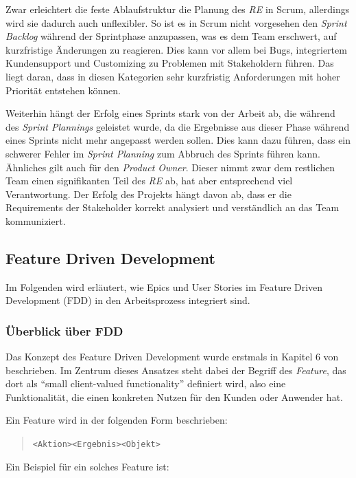 \documentclass[acmtog]{acmart}
\begin{document}
Zwar erleichtert die feste Ablaufstruktur die Planung des \emph{RE} in Scrum, allerdings wird sie dadurch auch unflexibler. So ist es in Scrum nicht
vorgesehen den \emph{Sprint Backlog} während der Sprintphase anzupassen, was es dem Team erschwert, auf kurzfristige Änderungen zu reagieren. Dies
kann vor allem bei Bugs, integriertem Kundensupport und Customizing zu Problemen mit Stakeholdern führen. Das liegt daran, dass in
diesen Kategorien sehr kurzfristig Anforderungen mit hoher Priorität entstehen können.

Weiterhin hängt der Erfolg eines Sprints stark von der Arbeit ab, die während des \emph{Sprint Plannings} geleistet wurde, da die Ergebnisse aus
dieser Phase während eines Sprints nicht mehr angepasst werden sollen. Dies kann dazu führen, dass ein schwerer Fehler im \emph{Sprint Planning} zum
Abbruch des Sprints führen kann. Ähnliches gilt auch für den \emph{Product Owner}. Dieser nimmt zwar dem restlichen Team einen signifikanten Teil
des \emph{RE} ab, hat aber entsprechend viel Verantwortung. Der Erfolg des Projekts hängt davon ab, dass er die Requirements der Stakeholder korrekt
analysiert und verständlich an das Team kommuniziert.

\subsection{Feature Driven Development}
Im Folgenden wird erläutert, wie Epics und User Stories im Feature Driven Development (FDD) in den Arbeitsprozess integriert sind.

\subsubsection{Überblick über FDD}
Das Konzept des Feature Driven Development wurde erstmals in Kapitel 6 von \cite{coad99} beschrieben.
Im Zentrum dieses Ansatzes steht dabei der Begriff des \emph{Feature}, das dort als ``small client-valued functionality'' definiert wird, also eine Funktionalität, die einen konkreten Nutzen für den Kunden oder Anwender hat.

Ein Feature wird in der folgenden Form beschrieben:

\begin{quote}
	\texttt{<Aktion>\hspace{5ex}<Ergebnis>\hspace{5ex}<Objekt>}
\end{quote}

Ein Beispiel für ein solches Feature ist:
\end{document}
